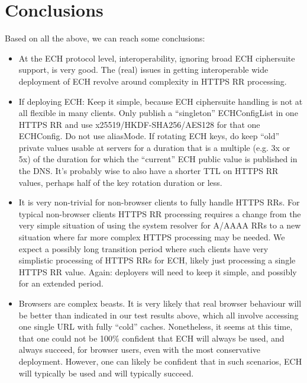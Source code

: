\section{Conclusions}

Based on all the above, we can reach some conclusions:

\begin{itemize}

    \item
        At the ECH protocol level, interoperability, ignoring broad ECH
        ciphersuite support, is very good. The (real) issues in getting
        interoperable wide deployment of ECH revolve around complexity in HTTPS
        RR processing.

    \item
        If deploying ECH: Keep it simple, because ECH ciphersuite handling is
        not at all flexible in many clients. Only publish a ``singleton''
        ECHConfigList in one HTTPS RR and use x25519/HKDF-SHA256/AES128 for
        that one ECHConfig. Do not use aliasMode. If rotating ECH keys, do keep
        ``old'' private values usable at servers for a duration that is a
        multiple (e.g. 3x or 5x) of the duration for which the ``current'' ECH
        public value is published in the DNS. It's probably wise to also have a
        shorter TTL on HTTPS RR values, perhaps half of the key rotation
        duration or less.

    \item It is very non-trivial for non-browser clients to fully handle HTTPS
        RRs.  For typical non-browser clients HTTPS RR processing requires a
        change from the very simple situation of using the system resolver for
        A/AAAA RRs to a new situation where far more complex HTTPS processing
        may be needed. We expect a possibly long transition period where such
        clients have very simplistic processing of HTTPS RRs for ECH, likely
        just processing a single HTTPS RR value. Again: deployers will need to
        keep it simple, and possibly for an extended period.

    \item
        Browsers are complex beasts. It is very likely that real browser
        behaviour will be better than indicated in our test results above,
        which all involve accessing one single URL with fully ``cold'' caches.
        Nonetheless, it seems at this time, that one could not be 100\%
        confident that ECH will always be used, and always succeed, for browser
        users, even with the most conservative deployment. However, one can
        likely be confident that in such scenarios, ECH will typically be used
        and will typically succeed.

\end{itemize}

